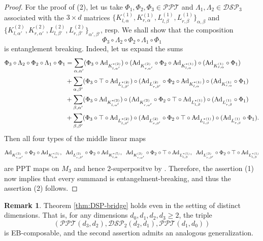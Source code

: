\documentclass[11pt,reqno]{amsart}
\theoremstyle{definition}
\theoremstyle{definition}
\newtheorem{remark}[theorem]{Remark}
\theoremstyle{definition}
\theoremstyle{definition}
\newcommand{\DSP}{\mathcal{DSP}}
\newcommand{\PPT}{\mathcal{PPT}}
\newcommand{\Ad}{{\rm Ad}}
\begin{document}
\begin{proof}
For the proof of (2), let us take $\Phi_1,\Phi_2,\Phi_3\in \PPT$ and $\Lambda_1,\Lambda_2\in \DSP_3$ associated with the $3\times d$ matrices $\{K_{l,\alpha}^{(1)},K_{r,\alpha}^{(1)}, L_{l,\beta}^{(1)},L_{r,\beta}^{(1)}\}_{\alpha,\beta}$ and $\{K_{l,\alpha'}^{(2)},K_{r,\alpha'}^{(2)}, L_{l,\beta'}^{(2)},L_{r,\beta'}^{(2)}\}_{\alpha',\beta'}$, resp. We shall show that the composition
    $$\Phi_3\circ \Lambda_2 \circ \Phi_2 \circ \Lambda_1 \circ \Phi_1$$
is entanglement breaking. Indeed, let us expand the sums
\begin{align*}
    \Phi_3\circ \Lambda_2 \circ \Phi_2 \circ \Lambda_1 \circ \Phi_1 &= \sum_{\alpha,\alpha'} (\Phi_3\circ \Ad_{K_{l,\alpha'}^{*(2)}})\circ (\Ad_{K_{r,\alpha'}^{(2)}}\circ \Phi_2 \circ \Ad_{K_{l,\alpha}^{*(1)}}) \circ (\Ad_{K_{r,\alpha}^{(1)}} \circ \Phi_1)\\
    &+ \sum_{\alpha,\beta'} (\Phi_3 \circ \top \circ \Ad_{L_{l,\beta'}^{*(2)}})\circ (\Ad_{L_{r,\beta'}^{(2)}}\circ \Phi_2 \circ \Ad_{K_{l,\alpha}^{*(1)}}) \circ (\Ad_{K_{r,\alpha}^{(1)}} \circ \Phi_1) \\
    &+ \sum_{\beta,\alpha'} (\Phi_3\circ \Ad_{K_{l,\alpha'}^{*(2)}})\circ (\Ad_{K_{r,\alpha'}^{(2)}}\circ \Phi_2 \circ \top \circ \Ad_{L_{l,\beta}^{*(1)}}) \circ (\Ad_{L_{r,\beta}^{(1)}} \circ \Phi_1)\\
    &+ \sum_{\beta,\beta'} (\Phi_3\circ \top \circ \Ad_{L_{l,\beta'}^{*(2)}})\circ (\Ad_{L_{r,\beta'}^{(2)}}\circ \Phi_2 \circ \top \circ \Ad_{L_{l,\beta}^{*(1)}}) \circ (\Ad_{L_{r,\beta}^{(1)}} \circ \Phi_1).
\end{align*}
Then 
all four types of the middle linear maps
    $$\Ad_{K_{r,\alpha'}^{(2)}}\circ \Phi_2 \circ \Ad_{K_{l,\alpha}^{*(1)}}, \;\; \Ad_{L_{r,\beta'}^{(2)}}\circ \Phi_2 \circ \Ad_{K_{l,\alpha}^{*(1)}}, \;\; \Ad_{K_{r,\alpha'}^{(2)}}\circ \Phi_2 \circ \top \circ \Ad_{L_{l,\beta}^{*(1)}}, \;\; \Ad_{L_{r,\beta'}^{(2)}}\circ \Phi_2 \circ \top \circ \Ad_{L_{l,\beta}^{*(1)}}$$
are PPT maps on $M_3$ and hence $2$-superpositve by \cite{YLT16,CYT19}. Therefore, the assertion (1) now implies that every summand is entangelment-breaking, and thus the assertion (2) follows.
\end{proof}

\begin{remark} \label{rem:DSPgeneral}
Theorem \ref{thm:DSP-bridge} holds even in the setting of distinct dimensions. That is, for any dimensions $d_0,d_1,d_2,d_3\geq 2$, the triple
    $$(\PPT(d_3,d_2), \DSP_2(d_2,d_1), \PPT(d_1,d_0))$$
is EB-composable, and the second assertion admits an analogous generalization.
\end{remark}
\end{document}
